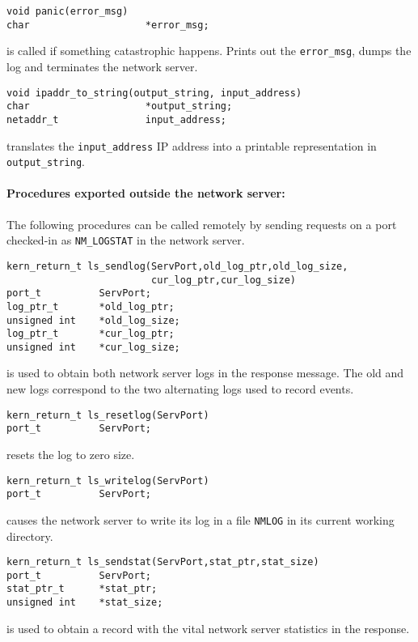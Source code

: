 \begin{verbatim}
void panic(error_msg)
char                    *error_msg;
\end{verbatim}
is called if something catastrophic happens.  Prints out the
\verb"error_msg", dumps the log and terminates the network server.

\begin{verbatim}
void ipaddr_to_string(output_string, input_address)
char                    *output_string;
netaddr_t               input_address;
\end{verbatim}
translates the \verb"input_address" IP address into a printable
representation in \verb"output_string".

\paragraph{Procedures exported outside the network server:}

The following procedures can be called remotely by sending requests on
a port checked-in as \verb"NM_LOGSTAT" in the network server.

\begin{verbatim}
kern_return_t ls_sendlog(ServPort,old_log_ptr,old_log_size,
                         cur_log_ptr,cur_log_size)
port_t          ServPort;
log_ptr_t       *old_log_ptr;
unsigned int    *old_log_size;
log_ptr_t       *cur_log_ptr;
unsigned int    *cur_log_size;
\end{verbatim}
is used to obtain both network server logs in the response message.
The old and new logs correspond to the two alternating logs used to
record events.

\begin{verbatim}
kern_return_t ls_resetlog(ServPort)
port_t          ServPort;
\end{verbatim}
resets the log to zero size.

\begin{verbatim}
kern_return_t ls_writelog(ServPort)
port_t          ServPort;
\end{verbatim}
causes the network server to write its log in a file \verb"NMLOG" in
its current working directory.

\begin{verbatim}
kern_return_t ls_sendstat(ServPort,stat_ptr,stat_size)
port_t          ServPort;
stat_ptr_t      *stat_ptr;
unsigned int    *stat_size;
\end{verbatim}
is used to obtain a record with the vital network server statistics
in the response.

